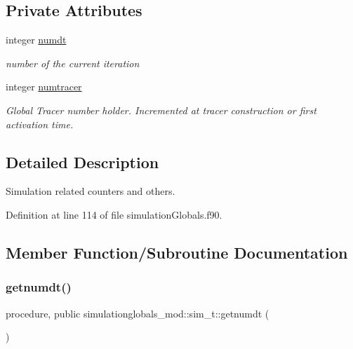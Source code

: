 \subsection*{Private Attributes}
\begin{DoxyCompactItemize}
\item 
integer \mbox{\hyperlink{structsimulationglobals__mod_1_1sim__t_acf2dd4822ebd48541ac6d018038b286a}{numdt}}
\begin{DoxyCompactList}\small\item\em number of the current iteration \end{DoxyCompactList}\item 
integer \mbox{\hyperlink{structsimulationglobals__mod_1_1sim__t_a23cc2df1e0cf56990759076ed07b69f1}{numtracer}}
\begin{DoxyCompactList}\small\item\em Global Tracer number holder. Incremented at tracer construction or first activation time. \end{DoxyCompactList}\end{DoxyCompactItemize}


\subsection{Detailed Description}
Simulation related counters and others. 

Definition at line 114 of file simulation\+Globals.\+f90.



\subsection{Member Function/\+Subroutine Documentation}
\mbox{\label{structsimulationglobals__mod_1_1sim__t_a4f67d96ae861d1600d365cc86acbc1a7}} 
\subsubsection{\texorpdfstring{getnumdt()}{getnumdt()}}
{\footnotesize\ttfamily procedure, public simulationglobals\+\_\+mod\+::sim\+\_\+t\+::getnumdt (\begin{DoxyParamCaption}{ }\end{DoxyParamCaption})}



